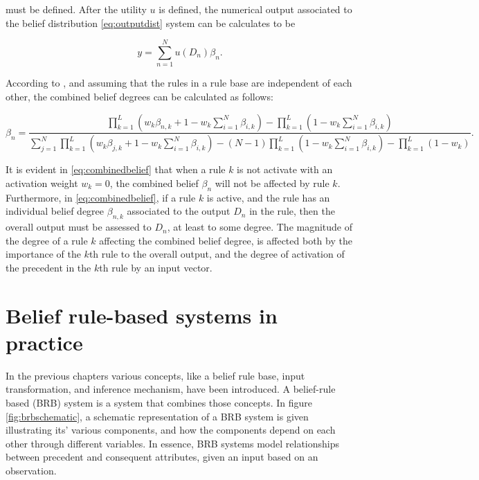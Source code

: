 must be defined. After the utility $u$ is defined, the numerical output associated to the
belief distribution \eqref{eq:outputdist} system can be
calculates to be

\begin{equation}
    \label{eq:utilitysum}
    y = \sum_{n=1}^{N}u(D_n)\beta_n.
\end{equation}

According to
\cite{Chen2011}, and assuming that the rules in a rule base are independent of each other,
the combined belief degrees can be calculated as follows:

\begin{equation}
    \label{eq:combinedbelief}
    \beta_n =
    \frac
    {\prod_{k=1}^L(w_k\beta_{n,k}+1-w_k\sum_{i=1}^N\beta_{i,k}) -
    \prod_{k=1}^L(1 - w_k\sum_{i=1}^N\beta_{i,k})}
    {\sum_{j=1}^N\prod_{k=1}^L(w_k\beta_{j,k}+1-w_k\sum_{i=1}^N\beta_{i,k}) -
    (N-1)\prod_{k=1}^L(1-w_k\sum_{i=1}^N\beta_{i,k})-\prod_{k=1}^L(1-w_k)}.
\end{equation}

It is evident in \eqref{eq:combinedbelief} that when a rule $k$ is not activate with an activation weight $w_k = 0$,
the combined belief $\beta_n$ will not be affected by rule $k$. Furthermore, in \eqref{eq:combinedbelief}, if a rule $k$
is active, and the rule has an individual belief degree $\beta_{n,k}$ associated to the output $D_n$ in the rule, then the overall output must be
assessed to $D_n$, at least to some degree. The magnitude of the degree of a rule $k$ affecting the combined belief degree, is
affected both by the importance of the $k$th rule to the overall output, and the degree of activation of the precedent in the $k$th
rule by an input vector.

\section{Belief rule-based systems in practice}
\label{inpractice}
In the previous chapters various concepts, like a belief rule base, input transformation, and inference mechanism, have been introduced.
A belief-rule based (BRB) system is a system that combines those concepts. In figure \ref{fig:brbschematic},
a schematic representation of a BRB system is given illustrating its' various components, and how the components depend on
each other through different variables. In essence, BRB systems model relationships between precedent and consequent attributes, given an
input based on an observation.

